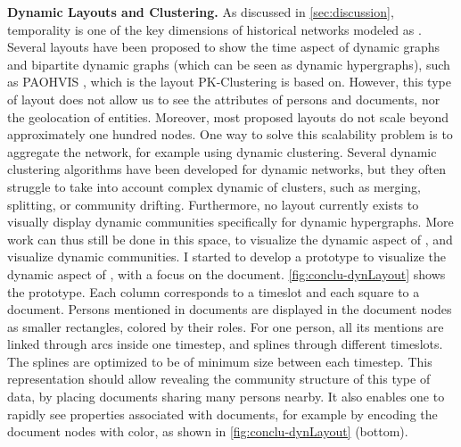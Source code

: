 \noindent\textbf{Dynamic Layouts and Clustering.} As discussed in \autoref{sec:discussion}, temporality is one of the key dimensions of historical networks modeled as \modelplural.
Several layouts have been proposed to show the time aspect of dynamic graphs\cite{brandesAsymmetricRelationsLongitudinal2011, VisualizingDynamicNetworks} and bipartite dynamic graphs (which can be seen as dynamic hypergraphs), such as PAOHVIS \cite{valdiviaAnalyzingDynamicHypergraphs2021}, which is the layout PK-Clustering is based on.
However, this type of layout does not allow us to see the attributes of persons and documents, nor the geolocation of entities.
Moreover, most proposed layouts do not scale beyond approximately one hundred nodes.
One way to solve this scalability problem is to aggregate the network, for example using dynamic clustering.
Several dynamic clustering algorithms have been developed for dynamic networks, but they often struggle to take into account complex dynamic of clusters, such as merging, splitting, or community drifting.
Furthermore, no layout currently exists to visually display dynamic communities specifically for dynamic hypergraphs.
More work can thus still be done in this space, to visualize the dynamic aspect of \modelplural, and visualize dynamic communities.
I started to develop a prototype to visualize the dynamic aspect of \modelplural, with a focus on the document.
\autoref{fig:conclu-dynLayout} shows the prototype.
Each column corresponds to a timeslot and each square to a document.
Persons mentioned in documents are displayed in the document nodes as smaller rectangles, colored by their roles.
For one person, all its mentions are linked through arcs inside one timestep, and splines through different timeslots.
The splines are optimized to be of minimum size between each timestep.
This representation should allow revealing the community structure of this type of data, by placing documents sharing many persons nearby.
It also enables one to rapidly see properties associated with documents, for example by encoding the document nodes with color, as shown in \autoref{fig:conclu-dynLayout} (bottom).

